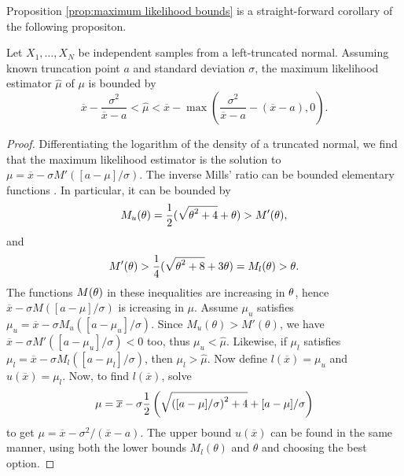 Proposition \ref{prop:maximum likelihood bounds} is a straight-forward
corollary of the following propositon. 
\begin{proposition}
\label{prop:ml bouds}Let $X_{1},\ldots,X_{N}$ be independent samples
from a left-truncated normal. Assuming known truncation point $a$
and standard deviation $\sigma$, the maximum likelihood estimator
$\hat{\mu}$ of $\mu$ is bounded by
\begin{equation}
\overline{x}-\frac{\sigma^{2}}{\overline{x}-a}<\hat{\mu}<\overline{x}-\max\left(\frac{\sigma^{2}}{\overline{x}-a}-(\overline{x}-a),0\right).\label{eq:ml bounds}
\end{equation}
\end{proposition}
\begin{proof}
Differentiating the logarithm of the density of a truncated normal,
we find that the maximum likelihood estimator is the solution to $\mu=\overline{x}-\sigma M'([a-\mu]/\sigma)$. The inverse Mills' ratio can be bounded
elementary functions . In particular, it can be
bounded by \parencite[Equation 32]{Gasull2014-hn}
\begin{equation}
M_{u}(\theta)=\frac{1}{2}(\sqrt{\text{\ensuremath{\theta}}^{2}+4}+\text{\ensuremath{\theta}})>M'(\text{\ensuremath{\theta}}),\label{eq:Mills' ratio inequality}
\end{equation}
and 
\begin{equation}
M'(\text{\ensuremath{\theta}})>\frac{1}{4}(\sqrt{\text{\ensuremath{\theta}}^{2}+8}+3\text{\ensuremath{\theta}})=M_{l}(\theta)>\theta.\label{eq:Mill's ratio inequality (2)}
\end{equation}
The functions $M(\text{\ensuremath{\theta}})$ in these inequalities
are increasing in $\text{\ensuremath{\theta}}$, hence $\overline{x}-\sigma M([a-\mu]/\sigma)$
is icreasing in $\mu$. Assume $\mu_{u}$ satisfies $\mu_{u}=\overline{x}-\sigma M_{u}([a-\mu_{u}]/\sigma)$.
Since $M_{u}(\theta)>M'(\theta)$, we have $\overline{x}-\sigma M'([a-\mu_{u}]/\sigma)<0$
too, thus $\mu_{u}<\hat{\mu}$. Likewise, if $\mu_{l}$ satisfies
$\mu_{l}=\overline{x}-\sigma M_{l}([a-\mu_{l}]/\sigma)$, then $\mu_{l}>\hat{\mu}$.
Now define $l(\overline{x})=\mu_{u}$ and $u(\overline{x})=\mu_{l}$.
Now, to find $l(\overline{x})$, solve
\[
\mu=\overline{x}-\sigma\frac{1}{2}\left(\sqrt{\text{\ensuremath{([a-\mu]/\sigma)}}^{2}+4}+\text{\ensuremath{[a-\mu]/\sigma}}\right)
\]
to get $\mu=\overline{x}-\sigma^{2}/(\overline{x}-a)$. The upper
bound $u(\overline{x})$ can be found in the same manner, using both
the lower bounds $M_{l}(\theta)$ and $\theta$ and choosing the best
option.
\end{proof}